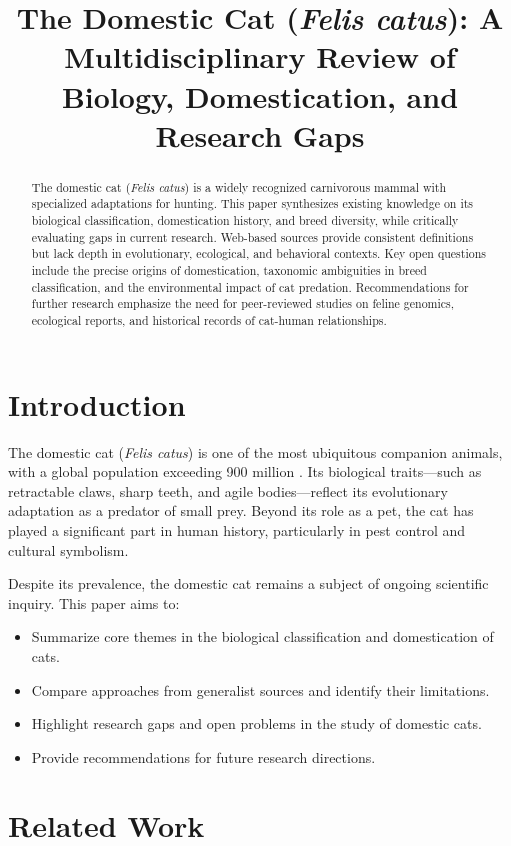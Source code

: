 \documentclass{article}
\title{The Domestic Cat (\textit{Felis catus}): A Multidisciplinary Review of Biology, Domestication, and Research Gaps}
\author{}
\date{}
\begin{document}
\maketitle

\begin{abstract}
The domestic cat (\textit{Felis catus}) is a widely recognized carnivorous mammal with specialized adaptations for hunting. This paper synthesizes existing knowledge on its biological classification, domestication history, and breed diversity, while critically evaluating gaps in current research. Web-based sources provide consistent definitions but lack depth in evolutionary, ecological, and behavioral contexts. Key open questions include the precise origins of domestication, taxonomic ambiguities in breed classification, and the environmental impact of cat predation. Recommendations for further research emphasize the need for peer-reviewed studies on feline genomics, ecological reports, and historical records of cat-human relationships.
\end{abstract}

\section{Introduction}
The domestic cat (\textit{Felis catus}) is one of the most ubiquitous companion animals, with a global population exceeding 900 million \cite{key1}. Its biological traits—such as retractable claws, sharp teeth, and agile bodies—reflect its evolutionary adaptation as a predator of small prey. Beyond its role as a pet, the cat has played a significant part in human history, particularly in pest control and cultural symbolism.

Despite its prevalence, the domestic cat remains a subject of ongoing scientific inquiry. This paper aims to:
\begin{itemize}
    \item Summarize core themes in the biological classification and domestication of cats.
    \item Compare approaches from generalist sources and identify their limitations.
    \item Highlight research gaps and open problems in the study of domestic cats.
    \item Provide recommendations for future research directions.
\end{itemize}

\section{Related Work}
\end{document}
